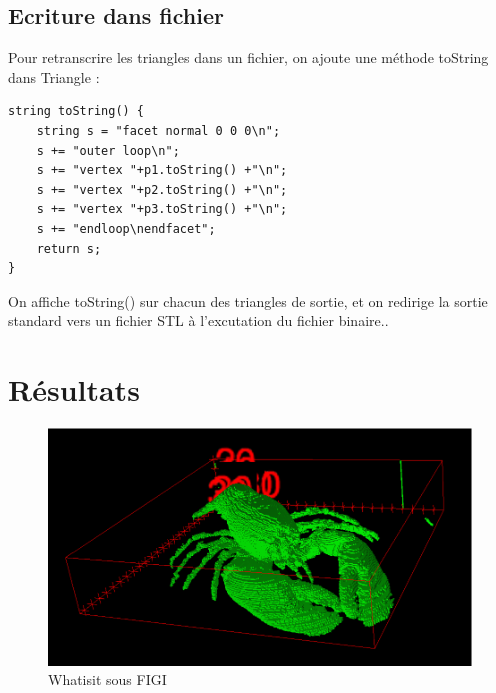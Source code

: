 \documentclass[a4paper,11pt]{article}
\begin{document}
\subsection{Ecriture dans fichier}

Pour retranscrire les triangles dans un fichier, on ajoute une méthode toString dans Triangle :

\begin{lstlisting}
string toString() {
	string s = "facet normal 0 0 0\n";
	s += "outer loop\n";
	s += "vertex "+p1.toString() +"\n";
	s += "vertex "+p2.toString() +"\n";
	s += "vertex "+p3.toString() +"\n";
	s += "endloop\nendfacet";
	return s;
}
\end{lstlisting}

On affiche toString() sur chacun des triangles de sortie, et on redirige la sortie standard vers un fichier STL à l'excutation du fichier binaire..

\section{Résultats}

\begin{figure}[H]
 \center
\includegraphics[scale=0.7]{homard_figi.png}
\caption{Whatisit sous FIGI}
\end{figure}
\end{document}
